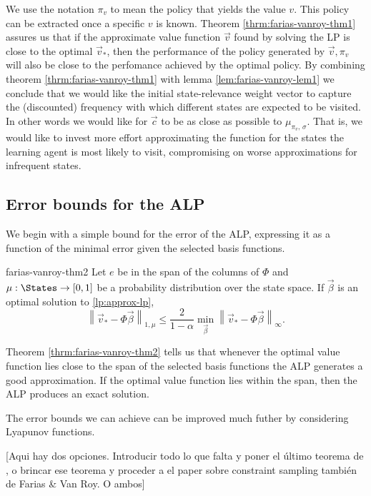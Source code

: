 We use the notation $\pi_v$ to mean the policy that yields the value $v$. This
policy can be extracted once a specific $v$ is known. Theorem
\ref{thrm:farias-vanroy-thm1} assures us that if the approximate value function
$\vec{v}$ found by solving the LP is close to the optimal $\vec{v}_{*}$, then
the performance of the policy generated by $\vec{v}, \pi_v$  will also be close
to the perfomance achieved by the optimal policy. By combining theorem
\ref{thrm:farias-vanroy-thm1} with lemma \ref{lem:farias-vanroy-lem1} we
conclude that we would like the initial state-relevance weight vector to capture
the (discounted) frequency with which different states are expected to be
visited. In other words we would like for $\vec{c}$ to be as close as possible
to $\mu_{\pi_v, \, \sigma}$. That is, we would like to invest more effort
approximating the function for the states the learning agent is most likely to
visit, compromising on worse approximations for infrequent states.

\subsection{Error bounds for the ALP}
We begin with a simple bound for the error of the ALP, expressing it as a
function of the minimal error given the selected basis functions.

\begin{thrm}{}{farias-vanroy-thm2}
    Let $e$ be in the span of the columns of $\Phi$ and $\mu: \States \to [0,1]$
    be a probability distribution over the state space. If $\vec{\beta}$ is an
    optimal solution to \eqref{lp:approx-lp},
    \begin{equation*}
        \left\| \vec{v}_* - \Phi \vec{\beta} \right\|_{1, \mu} \leq \frac{2}{1-\alpha} \min_{\vec{\beta}} \left\| \vec{v}_* - \Phi \vec{\beta} \right\|_{\infty}.
    \end{equation*}
\end{thrm}

Theorem \ref{thrm:farias-vanroy-thm2} tells us that whenever the optimal value
function lies close to the span of the selected basis functions the ALP
generates a good approximation. If the optimal value function lies within the
span, then the ALP produces an exact solution.

The error bounds we can achieve can be improved much futher by considering Lyapunov functions.

[Aqui hay dos opciones. Introducir todo lo que falta y poner el último teorema
de , o brincar ese teorema y proceder a el paper
sobre constraint sampling también de Farias \& Van Roy. O ambos]